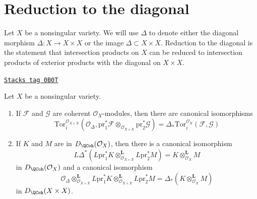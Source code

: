 \section{Reduction to the diagonal}
\label{intersection-section-reduction-diagonal}
Let $X$ be a nonsingular variety. We will use $\Delta$
to denote either the diagonal morphism $\Delta : X \to X \times X$
or the image $\Delta \subset X \times X$.
Reduction to the diagonal is the statement that
intersection products on $X$ can be reduced to intersection products
of exterior products with the diagonal on $X \times X$.

\begin{lemma}
\label{intersection-lemma-tor-and-diagonal}
\href{https://stacks.math.columbia.edu/tag/0B0T}{\texttt{Stacks tag 0B0T}}

Let $X$ be a nonsingular variety.
\begin{enumerate}
\item If $\mathcal{F}$ and $\mathcal{G}$ are coherent $\mathcal{O}_X$-modules,
then there are canonical isomorphisms
$$
\text{Tor}_i^{\mathcal{O}_{X \times X}}(\mathcal{O}_\Delta,
\text{pr}_1^*\mathcal{F} \otimes_{\mathcal{O}_{X \times X}}
\text{pr}_2^*\mathcal{G})
=
\Delta_*\text{Tor}_i^{\mathcal{O}_X}(\mathcal{F}, \mathcal{G})
$$
\item If $K$ and $M$ are in $D_\QCoh(\mathcal{O}_X)$, then
there is a canonical isomorphism
$$
L\Delta^* \left(
L\text{pr}_1^*K \otimes_{\mathcal{O}_{X \times X}}^\mathbf{L} L\text{pr}_2^*M
\right)
= K \otimes_{\mathcal{O}_X}^\mathbf{L} M
$$
in $D_\QCoh(\mathcal{O}_X)$ and a canonical isomorphism
$$
\mathcal{O}_\Delta \otimes_{\mathcal{O}_{X \times X}}^\mathbf{L}
L\text{pr}_1^*K \otimes_{\mathcal{O}_{X \times X}}^\mathbf{L} L\text{pr}_2^*M
= \Delta_*(K \otimes_{\mathcal{O}_X}^\mathbf{L} M)
$$
in $D_\QCoh(X \times X)$.
\end{enumerate}
\end{lemma}

